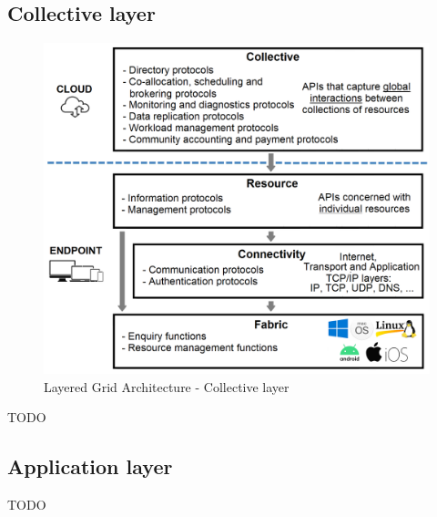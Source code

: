 \subsection{Collective layer}
\begin{figure}[!ht]
    \centering
    \includegraphics[scale=0.35]{document/chapters/chapter_2/images/collective_layer.png}
    \caption{Layered Grid Architecture - Collective layer}
    \label{fig:collective_layer}
\end{figure}

\noindent TODO

\subsection{Application layer}
TODO

